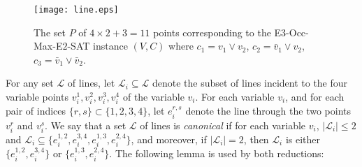 \documentclass[letterpaper,11pt]{article}
\def\L{{\mathcal L}}
\begin{document}
\begin{figure}[htb]
\centering\texttt{[image: line.eps]}
\caption{The set $P$ of $4\times 2 + 3 = 11$ points
corresponding to the {\sc E$3$-Occ-Max-E$2$-SAT} instance $(V,C)$ where
$c_1 = v_1 \lor v_2$,
$c_2 = \bar v_1 \lor v_2$,
$c_3 = \bar v_1 \lor \bar v_2$.}
\label{fig:line}
\end{figure}


For any set $\L$ of lines,
let $\L_i \subseteq \L$ denote the subset of lines
incident to the four variable points $v_i^1,v_i^2,v_i^3,v_i^4$
of the variable $v_i$.
For each variable $v_i$,
and for each pair of indices $\{r,s\} \subset \{1,2,3,4\}$,
let $e_i^{r,s}$ denote the line through the two points $v_i^r$ and $v_i^s$.
We say that a set $\L$ of lines is \emph{canonical} if for each variable $v_i$,
$|\L_i| \le 2$ and
$\L_i \subseteq \{e_i^{1,2},e_i^{3,4},e_i^{1,3},e_i^{2,4}\}$,
and moreover,
if $|\L_i| = 2$, then $\L_i$ is
either $\{e_i^{1,2},e_i^{3,4}\}$
or $\{e_i^{1,3},e_i^{2,4}\}$.
The following lemma is used by both reductions:
\end{document}
